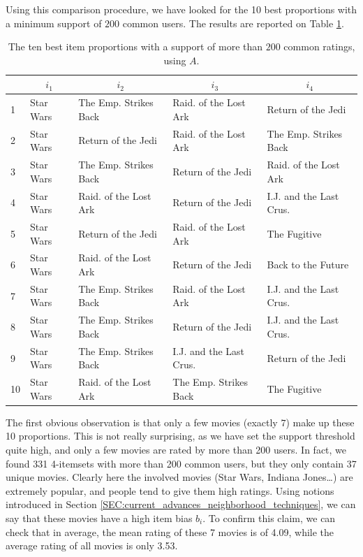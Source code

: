Using this comparison procedure, we have looked for the 10 best proportions
with a minimum support of $200$ common users. The results are reported on Table
\ref{TAB:best_prop_num_basic_200}.
\begin{table}[h!]
\centering
  \begin{tabular}{l l  l  l l}
\toprule
    &\multicolumn{1}{c}{$i_1$}  & \multicolumn{1}{c}{$i_2$} &
    \multicolumn{1}{c}{$i_3$} & \multicolumn{1}{c}{$i_4$}\\
  \midrule
 1&   Star Wars & The Emp. Strikes Back & Raid. of the Lost Ark & Return of the Jedi  \\
 2&   Star Wars & Return of the Jedi & Raid. of the Lost Ark & The Emp. Strikes Back  \\
 3&   Star Wars & The Emp. Strikes Back & Return of the Jedi & Raid. of the Lost Ark  \\
 4&   Star Wars & Raid. of the Lost Ark & Return of the Jedi & I.J. and the Last Crus.  \\
 5&   Star Wars & Return of the Jedi & Raid. of the Lost Ark & The Fugitive  \\
 6&   Star Wars & Raid. of the Lost Ark & Return of the Jedi & Back to the Future  \\
 7&   Star Wars & The Emp. Strikes Back & Raid. of the Lost Ark & I.J. and the Last Crus.  \\
 8&   Star Wars & The Emp. Strikes Back & Return of the Jedi & I.J. and the Last Crus.  \\
 9&   Star Wars & The Emp. Strikes Back & I.J. and the Last Crus. & Return of the Jedi  \\
 10&   Star Wars & Raid. of the Lost Ark & The Emp. Strikes Back & The Fugitive\\
\bottomrule
\end{tabular}
\caption{The ten best item proportions with a support of more than $200$ common
  ratings, using $A$.}
  \label{TAB:best_prop_num_basic_200}
\end{table}

The first obvious observation is that only a few movies (exactly $7$) make up
these 10 proportions. This is not really surprising, as we have set the support
threshold quite high, and only a few movies are rated by more than 200 users.
In fact, we found 331 4-itemsets with more than 200 common users, but they only
contain 37 unique movies. Clearly here the involved movies (Star Wars, Indiana
Jones\dots) are extremely popular, and people tend to give them high ratings.
Using notions introduced in Section
\ref{SEC:current_advances_neighborhood_techniques}, we can say that these
movies have a high item bias $b_i$. To confirm this claim, we can check that in
average, the mean rating of these 7 movies is of 4.09, while the average rating
of all movies is only 3.53.

